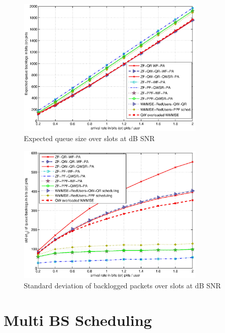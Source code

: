 \documentclass{beamer}
\begin{document}
\begin{frame}
\begin{figure}
\centering
\includegraphics[width=0.8\textwidth]{single-bs-3}
\caption[short]{Expected queue size  over  slots at dB SNR}
\label{single-bs-f3}
\end{figure}
\end{frame}

\begin{frame}
\begin{figure}
\centering
\includegraphics[width=0.8\textwidth]{single-bs-4}
\caption[short]{Standard deviation of backlogged packets  over  slots at dB SNR}
\label{single-bs-f4}
\end{figure}
\end{frame}

\section{Multi BS Scheduling}
\end{document}

